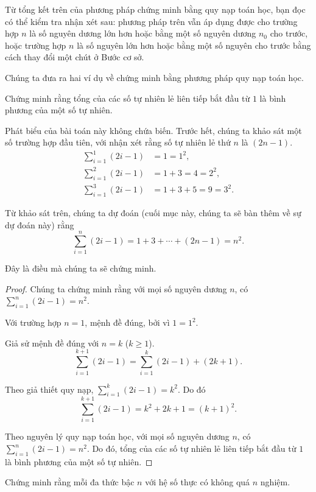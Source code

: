 Từ tổng kết trên của phương pháp chứng minh bằng quy nạp toán học, bạn đọc có thể kiểm tra nhận xét sau: phương pháp trên vẫn áp dụng được cho trường hợp $n$ là số nguyên dương lớn hơn hoặc bằng một số nguyên dương $n_{0}$ cho trước, hoặc trường hợp $n$ là số nguyên lớn hơn hoặc bằng một số nguyên cho trước bằng cách thay đổi một chút ở Bước cơ sở.

Chúng ta đưa ra hai ví dụ về chứng minh bằng phương pháp quy nạp toán học.

\begin{example}
    Chứng minh rằng tổng của các số tự nhiên lẻ liên tiếp bắt đầu từ $1$ là bình phương của một số tự nhiên.
\end{example}

Phát biểu của bài toán này không chứa biến. Trước hết, chúng ta khảo sát một số trường hợp đầu tiên, với nhận xét rằng số tự nhiên lẻ thứ $n$ là $(2n - 1)$.
\begin{align*}
    \sum^{1}_{i=1}(2i - 1) & = 1 = 1^{2},             \\
    \sum^{2}_{i=1}(2i - 1) & = 1 + 3 = 4 = 2^{2},     \\
    \sum^{3}_{i=1}(2i - 1) & = 1 + 3 + 5 = 9 = 3^{2}.
\end{align*}

Từ khảo sát trên, chúng ta dự đoán (cuối mục này, chúng ta sẽ bàn thêm về sự dự đoán này) rằng
\[
    \sum^{n}_{i=1}(2i - 1) = 1 + 3 + \cdots + (2n - 1) = n^{2}.
\]

Đây là điều mà chúng ta sẽ chứng minh.

\begin{proof}
    Chúng ta chứng minh rằng với mọi số nguyên dương $n$, có $\sum^{n}_{i=1}(2i - 1) = n^{2}$.

    Với trường hợp $n = 1$, mệnh đề đúng, bởi vì $1 = 1^{2}$.

    Giả sử mệnh đề đúng với $n = k$ ($k\geq 1$).
    \[
        \sum^{k+1}_{i=1}(2i - 1) = \sum^{k}_{i=1}(2i - 1) + (2k + 1).
    \]

    Theo giả thiết quy nạp, $\sum^{k}_{i=1}(2i - 1) = k^{2}$. Do đó
    \[
        \sum^{k+1}_{i=1}(2i - 1) = k^{2} + 2k + 1 = {(k+1)}^{2}.
    \]

    Theo nguyên lý quy nạp toán học, với mọi số nguyên dương $n$, có $\sum^{n}_{i=1}(2i - 1) = n^{2}$. Do đó, tổng của các số tự nhiên lẻ liên tiếp bắt đầu từ $1$ là bình phương của một số tự nhiên.
\end{proof}

\begin{example}
    Chứng minh rằng mỗi đa thức bậc $n$ với hệ số thực có không quá $n$ nghiệm.
\end{example}

